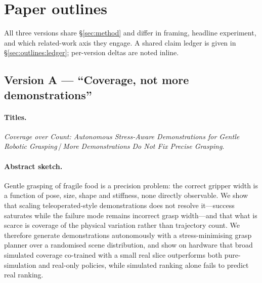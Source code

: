 \section{Paper outlines}
\label{sec:outlines}

All three versions share \S\ref{sec:method} and differ in framing, headline experiment, and
which related-work axis they engage. A shared claim ledger is given in
\S\ref{sec:outlines:ledger}; per-version deltas are noted inline.

\subsection{Version A --- ``Coverage, not more demonstrations''}
\label{sec:outlines:A}

\paragraph{Titles.}
\emph{Coverage over Count: Autonomous Stress-Aware Demonstrations for Gentle Robotic
Grasping}\,/\,\emph{More Demonstrations Do Not Fix Precise Grasping}.

\paragraph{Abstract sketch.}
Gentle grasping of fragile food is a precision problem: the correct gripper width is a
function of pose, size, shape and stiffness, none directly observable. We show that scaling
teleoperated-style demonstrations does not resolve it---success saturates while the failure
mode remains incorrect grasp width---and that what is scarce is coverage of the physical
variation rather than trajectory count. We therefore generate demonstrations autonomously
with a stress-minimising grasp planner over a randomised scene distribution, and show
on hardware that broad simulated coverage co-trained with a small real slice outperforms both
pure-simulation and real-only policies, while simulated ranking alone fails to predict real
ranking.

